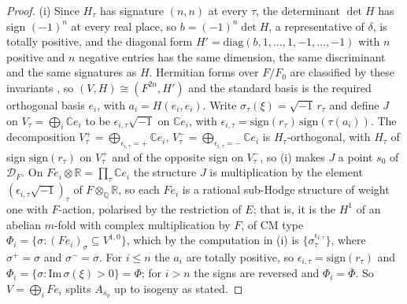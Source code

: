 \documentclass[11pt,reqno]{amsart}
\theoremstyle{plain}
\theoremstyle{definition}
\theoremstyle{remark}
\newcommand{\QQ}{\mathbb{Q}}
\newcommand{\RR}{\mathbb{R}}
\newcommand{\CC}{\mathbb{C}}
\newcommand{\cD}{\mathcal{D}}
\newcommand{\bbar}[1]{\overline{#1}}
\begin{document}
\begin{proof}
(i) Since $H_{\tau}$ has signature $(n,n)$ at every $\tau$, the determinant
$\det H$ has sign $(-1)^{n}$ at every real place, so $b=(-1)^{n}\det H$, a
representative of $\delta$, is totally positive, and the diagonal form $H'=\mathrm{diag}(b,1,\dots,1,-1,\dots,-1)$
with $n$ positive and $n$ negative entries has the same dimension, the same
discriminant and the same signatures as $H$. Hermitian forms over $F/F_{0}$
are classified by these invariants \cite[Ch.~10, \S6]{Sch85}, so
$(V,H)\cong(F^{2n},H')$ and the standard basis is the required orthogonal
basis $e_{i}$, with $a_{i}=H(e_{i},e_{i})$. Write $\sigma_{\tau}(\xi)=\sqrt{-1}\,r_{\tau}$
and define $J$ on $V_{\tau}=\bigoplus_{i}\CC e_{i}$ to be
$\epsilon_{i,\tau}\sqrt{-1}$ on $\CC e_{i}$, with
$\epsilon_{i,\tau}=\mathrm{sign}(r_{\tau})\,\mathrm{sign}(\tau(a_{i}))$. The
decomposition $V_{\tau}^{+}=\bigoplus_{\epsilon_{i,\tau}=+}\CC e_{i}$,
$V_{\tau}^{-}=\bigoplus_{\epsilon_{i,\tau}=-}\CC e_{i}$ is $H_{\tau}$-orthogonal,
with $H_{\tau}$ of sign $\mathrm{sign}(r_{\tau})$ on $V_{\tau}^{+}$ and of the
opposite sign on $V_{\tau}^{-}$, so (i) makes $J$ a point
$s_{0}$ of $\cD_{F}$. On $Fe_{i}\otimes\RR=\prod_{\tau}\CC e_{i}$ the
structure $J$ is multiplication by the element
$(\epsilon_{i,\tau}\sqrt{-1})_{\tau}$ of $F\otimes_{\QQ}\RR$, so each $Fe_{i}$
is a rational sub-Hodge structure of weight one with $F$-action, polarised by
the restriction of $E$; that is, it is the $H^{1}$ of an abelian $m$-fold with
complex multiplication by $F$, of CM type
$\Phi_{i}=\{\sigma:(Fe_{i})_{\sigma}\subseteq V^{1,0}\}$, which by the
computation in (i) is
$\{\sigma_{\tau}^{\epsilon_{i,\tau}}\}$, where $\sigma^{+}=\sigma$ and
$\sigma^{-}=\bbar\sigma$. For $i\le n$ the $a_{i}$ are totally positive, so
$\epsilon_{i,\tau}=\mathrm{sign}(r_{\tau})$ and
$\Phi_{i}=\{\sigma:\mathrm{Im}\,\sigma(\xi)>0\}=\Phi$; for $i>n$ the signs are
reversed and $\Phi_{i}=\bbar\Phi$. So $V=\bigoplus_{i}Fe_{i}$ splits
$A_{s_{0}}$ up to isogeny as stated.


\end{proof}
\end{document}
